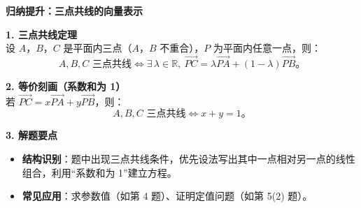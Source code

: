 \documentclass[UTF8,10pt,aspectratio=169]{ctexbeamer}
\begin{document}
	\begin{frame}
		\begin{center}
			{\Large \textbf{归纳提升：三点共线的向量表示}}
		\end{center}
		\vspace{0.4cm}
		
		\textbf{1. 三点共线定理} \\
		设 $A$，$B$，$C$ 是平面内三点（$A$，$B$ 不重合），$P$ 为平面内任意一点，则：
		$$A, B, C \text{ 三点共线} \iff \exists\, \lambda \in \mathbb{R},\ \overrightarrow{PC} = \lambda \overrightarrow{PA} + (1-\lambda)\overrightarrow{PB}。$$
		
		\pause
		\vspace{0.3cm}
		\textbf{2. 等价刻画（系数和为 1）} \\
		若 $\overrightarrow{PC} = x\overrightarrow{PA} + y\overrightarrow{PB}$，则：
		$$A, B, C \text{ 三点共线} \iff x + y = 1。$$
		
		\pause
		\vspace{0.3cm}
		\textbf{3. 解题要点} 
		\begin{itemize}
			\item \textbf{结构识别}：题中出现三点共线条件，优先设法写出其中一点相对另一点的线性组合，利用“系数和为 1”建立方程。
			\item \textbf{常见应用}：求参数值（如第 4 题）、证明定值问题（如第 5(2) 题）。
		\end{itemize}
	\end{frame}
	
\end{document}
